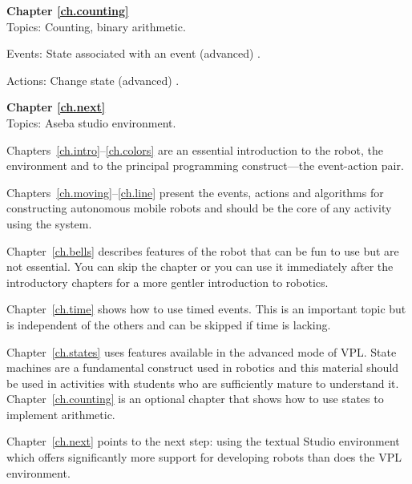 \bigskip
\bigskip

{\centering \textbf{Chapter \ref{ch.counting}}\\}
Topics: Counting, binary arithmetic.

Events: State associated with an event (advanced) .

Actions: Change state (advanced) .

\bigskip
\bigskip

{\centering \textbf{Chapter \ref{ch.next}}\\}
Topics: Aseba studio environment.

\bigskip



Chapters~\ref{ch.intro}--\ref{ch.colors} are an essential introduction
to the robot, the environment and to the principal programming construct---the
event-action pair.

Chapters~\ref{ch.moving}--\ref{ch.line} present the events, actions and algorithms
for constructing autonomous mobile robots and should be the core of any
activity using the system.

Chapter~\ref{ch.bells} describes features of the robot that can
be fun to use but are not essential. You can skip the chapter or you can 
use it immediately after the introductory chapters
for a more gentler introduction to robotics.

Chapter~\ref{ch.time} shows how to use timed events.
This is an important topic but is independent of the others
and can be skipped if time is lacking.

Chapter~\ref{ch.states} uses features available in the advanced mode of VPL.
State machines are a fundamental construct used in robotics and this material
should be used in activities with students who are sufficiently mature to understand it. Chapter~\ref{ch.counting} is an optional chapter that shows
how to use states to implement arithmetic.

Chapter~\ref{ch.next} points to the next step: using
the textual Studio environment which offers significantly more support for
developing robots than does the VPL environment.
